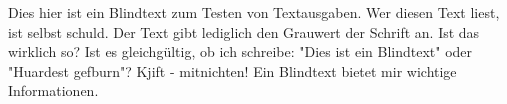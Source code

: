 %
\null\vfil
\begin{otherlanguage}{ngerman}
\begin{center}\textsf{\textbf{\abstractname}}\end{center}

\noindent Dies hier ist ein Blindtext zum Testen von Textausgaben. Wer diesen Text liest, 
ist selbst schuld. Der Text gibt lediglich den Grauwert der Schrift an. 
Ist das wirklich so? Ist es gleichgültig, ob ich schreibe: "Dies ist ein Blindtext" 
oder "Huardest gefburn"? Kjift - mitnichten! Ein Blindtext bietet mir wichtige Informationen.

\end{otherlanguage}
\vfil\null



